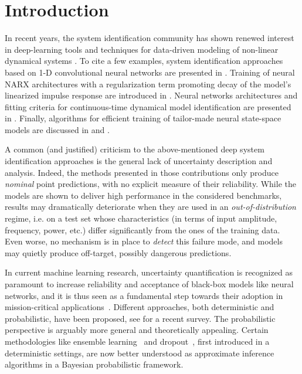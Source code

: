 \documentclass{article}
\begin{document}
\section{Introduction}
In recent years, the system identification community has shown renewed interest in deep-learning tools and techniques for data-driven modeling of non-linear dynamical systems \citep{ljung2020deep}. %
To cite a few examples, system identification approaches based on 1-D convolutional neural networks are presented in \cite{andersson2019, wu2019deep}.
Training of neural NARX architectures with a regularization term promoting decay of the model's linearized impulse response are introduced in 
\cite{peeters2022narx}. Neural networks architectures and fitting criteria  for continuous-time dynamical model identification are presented in \cite{Mavkov20}. 
Finally, algorithms for efficient training of tailor-made neural state-space models are discussed in \cite{forgione2020model} and \cite{beintema2021nonlinear}. 

A common (and justified) criticism to the above-mentioned deep system identification approaches is the general lack of uncertainty description and analysis. Indeed, the methods presented in those contributions only produce \emph{nominal} point predictions, with no explicit measure of their reliability.
While the models are shown to deliver high performance in the considered benchmarks, results may dramatically deteriorate when they are used in an \emph{out-of-distribution} regime, i.e. on a test set whose characteristics (in terms of input amplitude, frequency, power, etc.) differ significantly from the ones of the training data. Even worse, no mechanism is in place to \emph{detect} this failure mode, and models may quietly produce off-target, possibly dangerous predictions.

In current machine learning research, uncertainty quantification is recognized as paramount to increase reliability and acceptance of black-box models like neural networks, and it is thus seen as a fundamental step towards their adoption in mission-critical
applications~\citep{loquercio2020general}. Different approaches, both deterministic and probabilistic, have been proposed, see \cite{gawlikowski2021survey} for a recent survey. The probabilistic perspective is arguably more general and theoretically appealing. Certain methodologies like ensemble learning~\citep{lakshminarayanan2017simple} and dropout~\citep{srivastava2014dropout}, first introduced in a deterministic settings, are now better understood as approximate inference algorithms in a Bayesian probabilistic framework.
\end{document}

